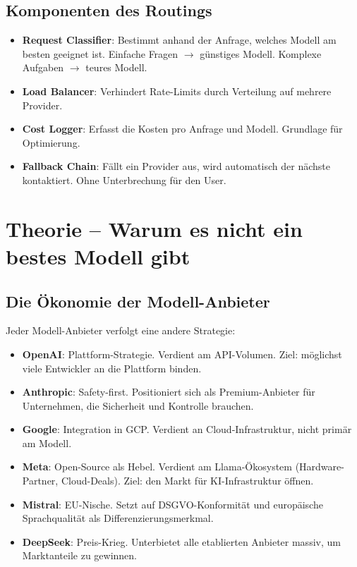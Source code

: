 \subsection{Komponenten des Routings}

\begin{itemize}[leftmargin=*]
    \item \textbf{Request Classifier}: Bestimmt anhand der Anfrage, welches Modell am besten geeignet ist. Einfache Fragen $\rightarrow$ günstiges Modell. Komplexe Aufgaben $\rightarrow$ teures Modell.
    \item \textbf{Load Balancer}: Verhindert Rate-Limits durch Verteilung auf mehrere Provider.
    \item \textbf{Cost Logger}: Erfasst die Kosten pro Anfrage und Modell. Grundlage für Optimierung.
    \item \textbf{Fallback Chain}: Fällt ein Provider aus, wird automatisch der nächste kontaktiert. Ohne Unterbrechung für den User.
\end{itemize}

\section{Theorie -- Warum es nicht ein bestes Modell gibt}

\subsection{Die Ökonomie der Modell-Anbieter}

Jeder Modell-Anbieter verfolgt eine andere Strategie:

\begin{itemize}[leftmargin=*]
    \item \textbf{OpenAI}: Plattform-Strategie. Verdient am API-Volumen. Ziel: möglichst viele Entwickler an die Plattform binden.
    \item \textbf{Anthropic}: Safety-first. Positioniert sich als Premium-Anbieter für Unternehmen, die Sicherheit und Kontrolle brauchen.
    \item \textbf{Google}: Integration in GCP. Verdient an Cloud-Infrastruktur, nicht primär am Modell.
    \item \textbf{Meta}: Open-Source als Hebel. Verdient am Llama-Ökosystem (Hardware-Partner, Cloud-Deals). Ziel: den Markt für KI-Infrastruktur öffnen.
    \item \textbf{Mistral}: EU-Nische. Setzt auf DSGVO-Konformität und europäische Sprachqualität als Differenzierungsmerkmal.
    \item \textbf{DeepSeek}: Preis-Krieg. Unterbietet alle etablierten Anbieter massiv, um Marktanteile zu gewinnen.
\end{itemize}

